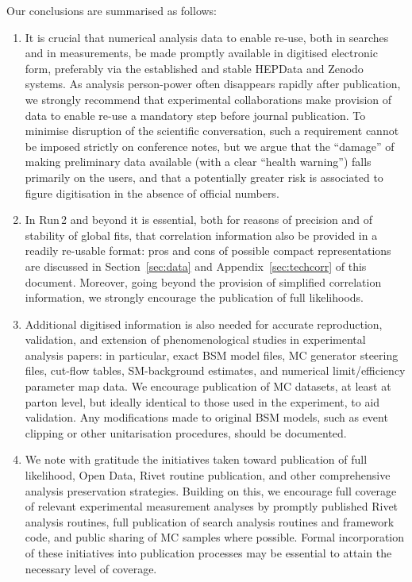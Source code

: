 \documentclass[a4paper,aps,prd,longbibliography,notitlepage,showpacs,amsmath,amssymb,superscriptaddress,nofootinbib,floatfix,11pt,preprintnumbers]{revtex4-1-mod}
\newcommand{\hepdata}{\textsf{HEPData}\xspace}
\newcommand{\rivet}{\textsf{Rivet}\xspace}
\begin{document}
Our conclusions are summarised as follows:

\begin{enumerate}
    \item It is crucial that numerical analysis data to enable re-use, both in searches and in measurements, be made promptly available in digitised electronic form, preferably via the established and stable \hepdata and \textsf{Zenodo} systems. As analysis person-power often disappears rapidly after publication, we strongly recommend that experimental collaborations make provision of data to enable re-use a mandatory step before journal publication. To minimise disruption of the scientific conversation, such a requirement cannot be imposed strictly on conference notes, but we argue that the ``damage'' of making preliminary data available (with a clear ``health warning'') falls primarily on the users, and that a potentially greater risk is associated to figure digitisation in the absence of official numbers.
    \item In Run\,2 and beyond it is essential, both for reasons of precision and of stability of global fits, that correlation information also be provided in a readily re-usable format: pros and cons of possible compact representations are discussed in Section~\ref{sec:data} and Appendix~\ref{sec:techcorr} of this document. Moreover, going beyond the provision of simplified correlation information, we strongly encourage the publication of full likelihoods.
    \item Additional digitised information is also needed for accurate reproduction, validation, and extension of phenomenological studies in experimental analysis papers: in particular, exact BSM model files, MC generator steering files, cut-flow tables, SM-background estimates, and numerical limit/efficiency parameter map data. We encourage publication of MC datasets, at least at parton level, but ideally identical to those used in the experiment, to aid validation. Any modifications made to original BSM models, such as event clipping or other unitarisation procedures, should be documented.
    \item We note with gratitude the initiatives taken toward publication of full likelihood, Open Data, \rivet routine publication, and other comprehensive analysis preservation strategies. Building on this, we encourage full coverage of relevant experimental measurement analyses by promptly published \rivet analysis routines, full publication of search analysis routines and framework code, and public sharing of MC samples where possible. Formal incorporation of these initiatives into publication processes may be essential to attain the necessary level of coverage.

\end{enumerate}
\end{document}
